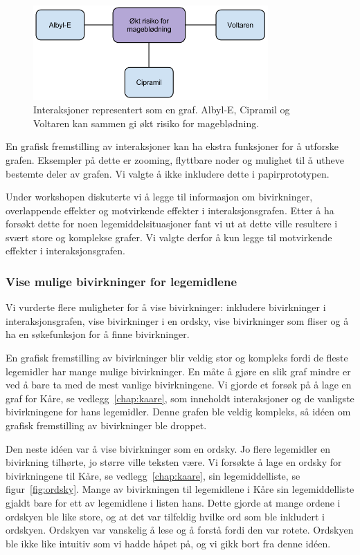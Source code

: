 \begin{figure}[H]
    \centering
    \includegraphics[width=0.8\textwidth]{fig/utviklingAvPrototype/grafPrototype.png}
    \caption{Interaksjoner representert som en graf. Albyl-E, Cipramil og Voltaren kan sammen gi økt risiko for mageblødning.}
    \label{fig:grafInteraksjon}
\end{figure} 

En grafisk fremstilling av interaksjoner kan ha ekstra funksjoner for å utforske grafen. Eksempler på dette er zooming, flyttbare noder og mulighet til å utheve bestemte deler av grafen. Vi valgte å ikke inkludere dette i papirprototypen. 

Under workshopen diskuterte vi å legge til informasjon om bivirkninger, overlappende effekter og motvirkende effekter i interaksjonsgrafen. Etter å ha forsøkt dette for noen legemiddelsituasjoner fant vi ut at dette ville resultere i svært store og komplekse grafer. Vi valgte derfor å kun legge til motvirkende effekter i interaksjonsgrafen.  

\subsubsection{Vise mulige bivirkninger for legemidlene}
Vi vurderte flere muligheter for å vise bivirkninger: inkludere bivirkninger i interaksjonsgrafen, vise bivirkninger i en ordsky, vise bivirkninger som fliser og å ha en søkefunksjon for å finne bivirkninger.  

En grafisk fremstilling av bivirkninger blir veldig stor og kompleks fordi de fleste legemidler har mange mulige bivirkninger. En måte å gjøre en slik graf mindre er ved å bare ta med de mest vanlige bivirkningene. Vi gjorde et forsøk på å lage en graf for Kåre, se vedlegg~\ref{chap:kaare}, som inneholdt interaksjoner og de vanligste bivirkningene for hans legemidler. Denne grafen ble veldig kompleks, så idéen om grafisk fremstilling av bivirkninger ble droppet. 

Den neste idéen var å vise bivirkninger som en ordsky. Jo flere legemidler en bivirkning tilhørte, jo større ville teksten være. Vi forsøkte å lage en ordsky for bivirkningene til Kåre, se vedlegg~\ref{chap:kaare}, sin legemiddelliste, se figur~\ref{fig:ordsky}. Mange av bivirkningen til legemidlene i Kåre sin legemiddelliste gjaldt bare for ett av legemidlene i listen hans. Dette gjorde at mange ordene i ordskyen ble like store, og at det var tilfeldig hvilke ord som ble inkludert i ordskyen. Ordskyen var vanskelig å lese og å forstå fordi den var rotete. Ordskyen ble ikke like intuitiv som vi hadde håpet på, og vi gikk bort fra denne idéen.

